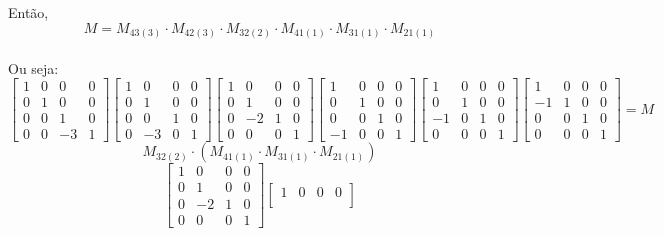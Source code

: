 \documentclass[leqno]{article}
\begin{document}
\begin{enumerate}
\begin{sol}
		Então, $$M = M_{43(3)} \cdot M_{42(3)} \cdot M_{32(2)} \cdot M_{41(1)} \cdot M_{31(1)} \cdot M_{21(1)}$$\\
		Ou seja:\\		
		$$\begin{bmatrix} 
			1 & 0 & 0 & 0 \\
			0 & 1 & 0 & 0 \\
			0 & 0 & 1 & 0 \\
			0 & 0 & -3 & 1 
		\end{bmatrix} 
		\begin{bmatrix} 
			1 & 0 & 0 & 0 \\
			0 & 1 & 0 & 0 \\
			0 & 0 & 1 & 0 \\
			0 & -3 & 0 & 1 
		\end{bmatrix} 
		\begin{bmatrix} 
			1 & 0 & 0 & 0 \\
			0 & 1 & 0 & 0 \\
			0 & -2 & 1 & 0 \\
			0 & 0 & 0 & 1 
		\end{bmatrix}
		\begin{bmatrix} 
			1 & 0 & 0 & 0 \\
			0 & 1 & 0 & 0 \\
			0 & 0 & 1 & 0 \\
			-1 & 0 & 0 & 1 
		\end{bmatrix}
		\begin{bmatrix} 
			1 & 0 & 0 & 0 \\
			0 & 1 & 0 & 0 \\
			-1 & 0 & 1 & 0 \\
			0 & 0 & 0 & 1 
		\end{bmatrix}
		\begin{bmatrix} 
			1 & 0 & 0 & 0 \\
			-1 & 1 & 0 & 0 \\
			0 & 0 & 1 & 0 \\
			0 & 0 & 0 & 1 
		\end{bmatrix} = M$$
		\newpage
		$$M_{32(2)} \cdot (M_{41(1)} \cdot M_{31(1)} \cdot M_{21(1)})$$
		$$\begin{bmatrix}
			1 & 0 & 0 & 0\\
			0 & 1 & 0 & 0\\
			0 & -2 & 1 & 0\\
			0 & 0 & 0 & 1
		\end{bmatrix}
		\begin{bmatrix}
			1 & 0 & 0 & 0\\

\end{bmatrix}$$
\end{sol}
\end{enumerate}
\end{document}
